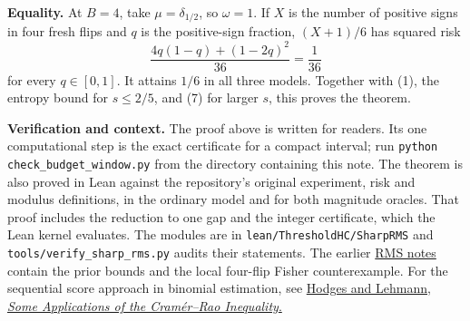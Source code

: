 \documentclass[11pt]{article}
\begin{document}
\textbf{Equality.} At $B=4$, take $\mu=\delta_{1/2}$, so $\omega=1$. If $X$ is the number of positive signs in four fresh flips and $q$ is the positive-sign fraction, $(X+1)/6$ has squared risk
\[
                \frac{4q(1-q)+(1-2q)^2}{36}=\frac1{36}
\]
for every $q\in[0,1]$. It attains $1/6$ in all three models. Together with (1), the entropy bound for $s\le2/5$, and (7) for larger $s$, this proves the theorem.

\textbf{Verification and context.} The proof above is written for readers. Its one computational step is the exact certificate for a compact interval; run \texttt{python check\_budget\_window.py} from the directory containing this note. The theorem is also proved in Lean against the repository's original experiment, risk and modulus definitions, in the ordinary model and for both magnitude oracles. That proof includes the reduction to one gap and the integer certificate, which the Lean kernel evaluates. The modules are in \texttt{lean/ThresholdHC/SharpRMS} and \texttt{tools/verify\_sharp\_rms.py} audits their statements. The earlier \href{https://github.com/davidiach/adaptive-threshold-estimation/tree/f5a2c44ae5cd43337dfacd83b86ba8812baf6f81/research/2026-11-17-rms-constants}{RMS notes} contain the prior bounds and the local four-flip Fisher counterexample. For the sequential score approach in binomial estimation, see \href{https://digicoll.lib.berkeley.edu/record/112743/files/math_s2_article-02.pdf}{Hodges and Lehmann, \emph{Some Applications of the Cram\'er--Rao Inequality}.}
\end{document}
